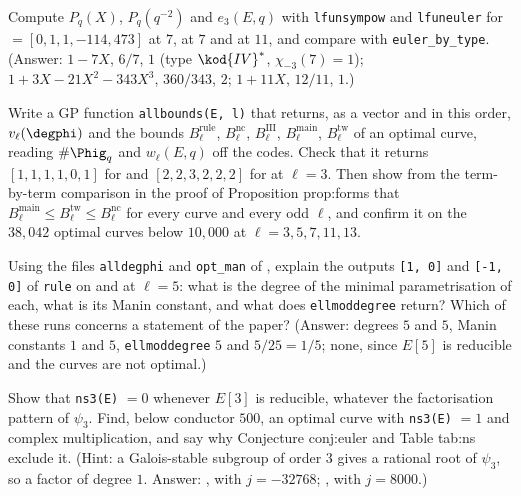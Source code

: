 \begin{sloppypar}
\begin{exercise}\label{exer:computation:euler}
Compute $P_q(X)$, $P_q(q^{-2})$ and $e_3(E,q)$ with \texttt{lfunsympow} and \texttt{lfuneuler} for  $=[0,1,1,-114,473]$ at $7$,  at
$7$ and  at $11$, and compare with \texttt{euler\_by\_type}. (Answer: $1-7X$, $6/7$, $1$ (type $\kod{IV}^*$, $\chi_{-3}(7)=1$); $1+3X-21X^2-343X^3$, $360/343$, $2$;
$1+11X$, $12/11$, $1$.)
\end{exercise}

\begin{exercise}\label{exer:computation:allbounds}
Write a GP function \texttt{allbounds(E, l)} that returns, as a vector and in this order, $v_\ell(\degphi)$ and the bounds $B^{\mathrm{rule}}_\ell$,
$B^{\mathrm{nc}}_\ell$, $B^{\mathrm{III}}_\ell$, $B^{\mathrm{main}}_\ell$, $B^{\mathrm{tw}}_\ell$ of an optimal curve, reading $\#\Phig_q$ and $w_\ell(E,q)$ off the codes. Check that it returns $[1,1,1,1,0,1]$ for  and $[2,2,3,2,2,2]$ for  at $\ell=3$. Then show from the term-by-term comparison in the
proof of Proposition prop:forms that $B^{\mathrm{main}}_\ell\le B^{\mathrm{tw}}_\ell\le B^{\mathrm{nc}}_\ell$ for every curve and every odd $\ell$, and confirm it on the $38{,}042$ optimal
curves below $10{,}000$ at $\ell=3,5,7,11,13$.
\end{exercise}

\begin{exercise}\label{exer:computation:nonoptimal}
Using the files \texttt{alldegphi} and \texttt{opt\_man} of , explain the outputs \texttt{[1, 0]} and \texttt{[-1, 0]} of \texttt{rule} on
 and  at $\ell=5$: what is the degree of the minimal parametrisation of each, what is its Manin constant, and what does
\texttt{ellmoddegree} return? Which of these runs concerns a statement of the paper? (Answer: degrees $5$ and $5$, Manin constants $1$ and $5$,
\texttt{ellmoddegree} $5$ and $5/25=1/5$; none, since $E[5]$ is reducible and the curves are not optimal.)
\end{exercise}

\begin{exercise}\label{exer:computation:ns3-reducible}
Show that \texttt{ns3(E)} $=0$ whenever $E[3]$ is reducible, whatever the factorisation pattern of $\psi_3$. Find, below conductor $500$, an optimal curve with
\texttt{ns3(E)} $=1$ and complex multiplication, and say why Conjecture conj:euler and Table tab:ns exclude it. (Hint: a Galois-stable subgroup of order $3$
gives a rational root of $\psi_3$, so a factor of degree $1$. Answer: , with $j=-32768$; , with $j=8000$.)
\end{exercise}


\end{sloppypar}
